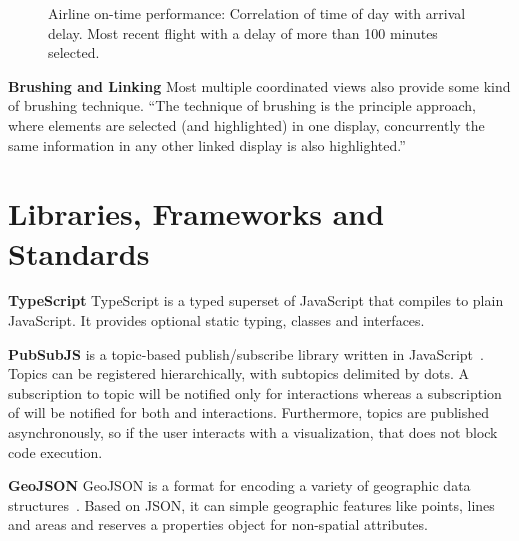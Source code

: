 \begin{figure}[h]
  \centering
  \caption{Airline on-time performance: Correlation of time of day with arrival delay. Most recent flight with a delay of more than 100 minutes selected.}\label{fig:research:cmv}
\end{figure}

\textbf{Brushing and Linking}
Most multiple coordinated views also provide some kind of brushing technique.
``The technique of brushing is the principle approach, where elements are selected (and highlighted) in one display, concurrently the same information in any other linked display is also highlighted.''\cite{Roberts2007}

\section{Libraries, Frameworks and Standards}

\textbf{TypeScript}
TypeScript is a typed superset of JavaScript that compiles to plain JavaScript.
It provides optional static typing, classes and interfaces.


\textbf{PubSubJS} is a topic-based publish/subscribe library written in JavaScript~\cite{PubSubJS2017}.
Topics can be registered hierarchically, with subtopics delimited by dots.
A subscription to topic  will be notified only for  interactions whereas a subscription of  will be notified for both  and  interactions.
Furthermore, topics are published asynchronously, so if the user interacts with a visualization, that does not block code execution.

\textbf{GeoJSON}
GeoJSON is a format for encoding a variety of geographic data structures~\cite{GeoJSON2017}.
Based on JSON, it can simple geographic features like points, lines and areas and reserves a properties object for non-spatial attributes.

